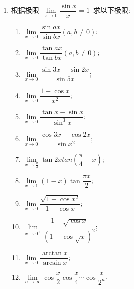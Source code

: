 \documentclass[UTF8,a4paper,20pt]{article}
\begin{document}
\begin{enumerate}[1.]
\item 根据极限~$\lim\limits_{x\to 0} \dfrac{\sin{x}}{x}=1$~求以下极限:
	\begin{multicols}{2}
	\begin{enumerate}[(1)]
	\item $\lim\limits_{x\to 0} \dfrac{\sin{ax}}{\sin{bx}} (a,b\neq 0)$;
	\item $\lim\limits_{x\to 0} \dfrac{\tan{ax}}{\tan{bx}} (a,b\neq 0)$;
	\item $\lim\limits_{x\to 0} \dfrac{\sin{3x}-\sin{2x}}{\sin{5x}}$;
	\item $\lim\limits_{x\to 0} \dfrac{1-\cos{x}}{x^2}$;
	\item $\lim\limits_{x\to 0} \dfrac{\tan{x}-\sin{x}}{\sin^3{x}}$;
	\item $\lim\limits_{x\to 0} \dfrac{\cos{3x}-\cos{2x}}{\sin{x^2}}$;
	\item $\lim\limits_{x\to \frac{\pi}{4}} \tan{2x}tan{(\dfrac{\pi}{4}-x)}$;
	\item $\lim\limits_{x\to 1} (1-x)\tan{\dfrac{\pi x}{2}}$;
	\item $\lim\limits_{x\to 0} \dfrac{\sqrt{1-\cos{x^2}}}{1-\cos{x}}$;
	\item $\lim\limits_{x\to 0^+} \dfrac{1-\sqrt{\cos{x}}}{(1-\cos{\sqrt{x}})^2}$;
	\item $\lim\limits_{x\to 0} \dfrac{\arctan{x}}{\arcsin{x}}$;
	\item $\lim\limits_{n\to\infty} \cos{\dfrac{x}{2}}\cos{\dfrac{x}{4}}\cdots\cos{\dfrac{x}{2^n}}$.
	\end{enumerate}
	\end{multicols}


\end{enumerate}
\end{document}
